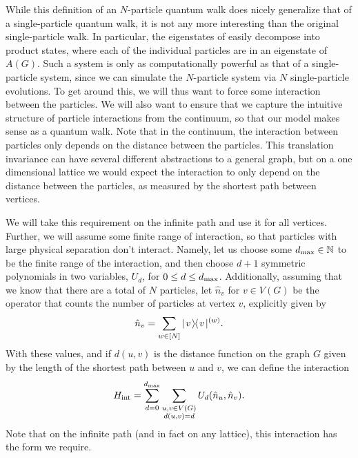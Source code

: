 \documentclass[../thesis-main/thesis-main]{subfiles}
\begin{document}
While this definition of an $N$-particle quantum walk does nicely generalize that of a single-particle quantum walk, it is not any more interesting than the original single-particle walk.  In particular, the eigenstates of  easily decompose into product states, where each of the individual particles are in an eigenstate of $A(G)$.  Such a system is only as computationally powerful as that of a single-particle system, since we can simulate the $N$-particle system via $N$ single-particle evolutions.  To get around this, we will thus want to force some interaction between the particles. We will also want to ensure that we capture the intuitive structure of particle interactions from the continuum, so that our model makes sense as a quantum walk.  Note that in the continuum, the interaction between particles only depends on the distance between the particles.  This translation invariance can have several different abstractions to a general graph, but on a one dimensional lattice we would expect the interaction to only depend on the distance between the particles, as measured by the shortest path between vertices.

We will take this requirement on the infinite path and use it for all vertices.  Further, we will assume some finite range of interaction, so that particles with large physical separation don't interact.   Namely, let us choose some $d_{\text{max}} \in \mathbb{N}$ to be the finite range of the interaction, and then choose $d+1$ symmetric polynomials in two variables, $U_{d}$, for $0\leq d \leq d_{\text{max}}$.  Additionally, assuming that we know that there are a total of $N$ particles, let $\hat{n}_v$ for $v\in V(G)$ be the operator that counts the number of particles at vertex $v$, explicitly given by 
\begin{align}
  \hat{n}_v = \sum_{w\in [N]} |\mspace{2mu} v \mspace{2mu} \rangle\mspace{-2mu}\langle\mspace{2mu} v \mspace{2mu} |^{(w)}.\label{eq:n_hat}
\end{align}
With these values, and if $d(u,v)$ is the distance function on the graph $G$ given by the length of the shortest path between $u$ and $v$, we can define the interaction
\begin{align}
  H_{\text{int}} = \sum_{d=0}^{d_{\text{max}}} \sum_{\substack{ u,v\in V(G)\\d(u,v) = d}}U_{d} (\hat{n}_u,\hat{n}_v).\label{eq:MPQW_int}
\end{align}
Note that on the infinite path (and in fact on any lattice), this interaction has the form we require.
\end{document}
